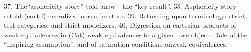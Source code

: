 \margin{$\bigcirc$}37.  The``asphericity story'' told anew  -  the ``key result''.  \margin{\rule{2cm}{0.4pt}}
38.  Asphericity story retold (contd)\hand{:} eneralized nerve functors.
39.  Returning upon terminology:  strict test categories, and strict
modelizers.
40.  Digression on cartesian products of weak equivalences in (Cat)\hand{;}
\hand{\unsure{\&}}  weak equivalences to a given base object.
  Role of the ``inspiring assumption'',  and of saturation conditions
onweak equivalences. \margin{\rule{2cm}{0.4pt}}

